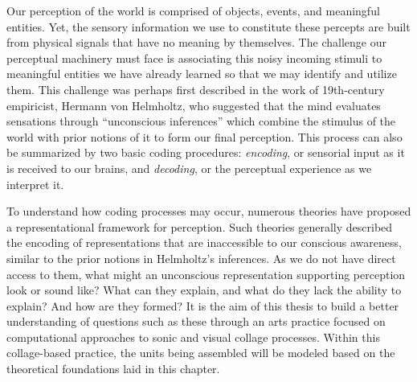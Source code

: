 \documentclass[a4paper,10pt,final]{ThesisStyle}
\begin{document}




Our perception of the world is comprised of objects, events, and meaningful entities.  Yet, the sensory information we use to constitute these percepts are built from physical signals that have no meaning by themselves.  The challenge our perceptual machinery must face is associating this noisy incoming stimuli to meaningful entities we have already learned so that we may identify and utilize them.  This challenge was perhaps first described in the work of 19th-century empiricist, Hermann von Helmholtz, who suggested that the mind evaluates sensations through ``unconscious inferences'' which combine the stimulus of the world with prior notions of it to form our final perception. This process can also be summarized by two basic coding procedures: \textit{encoding}, or sensorial input as it is received to our brains, and \textit{decoding}, or the perceptual experience as we interpret it.

To understand how coding processes may occur, numerous theories have proposed a representational framework for perception.  Such theories generally described the encoding of representations that are inaccessible to our conscious awareness, similar to the prior notions in Helmholtz's inferences.  As we do not have direct access to them, what might an unconscious representation supporting perception look or sound like?  What can they explain, and what do they lack the ability to explain?  And how are they formed?  It is the aim of this thesis to build a better understanding of questions such as these through an arts practice focused on computational approaches to sonic and visual collage processes.  Within this collage-based practice, the units being assembled will be modeled based on the theoretical foundations laid in this chapter.  
\end{document}
